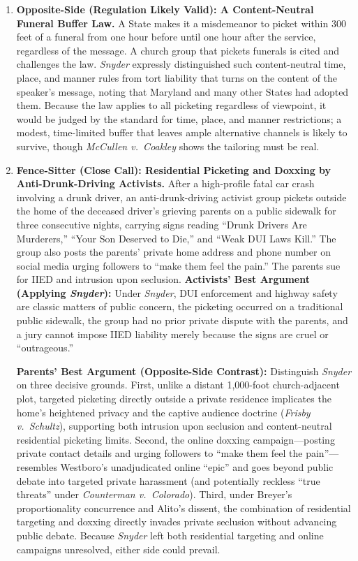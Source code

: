 \documentclass[12pt]{article}
\begin{document}
\begin{enumerate}
\item \textbf{Opposite-Side (Regulation Likely Valid): A Content-Neutral Funeral Buffer Law.} A State makes it a misdemeanor to picket within 300 feet of a funeral from one hour before until one hour after the service, regardless of the message. A church group that pickets funerals is cited and challenges the law. \textit{Snyder} expressly distinguished such content-neutral time, place, and manner rules from tort liability that turns on the content of the speaker's message, noting that Maryland and many other States had adopted them. Because the law applies to all picketing regardless of viewpoint, it would be judged by the standard for time, place, and manner restrictions; a modest, time-limited buffer that leaves ample alternative channels is likely to survive, though \textit{McCullen v.\ Coakley} shows the tailoring must be real.

\item \textbf{Fence-Sitter (Close Call): Residential Picketing and Doxxing by Anti-Drunk-Driving Activists.} After a high-profile fatal car crash involving a drunk driver, an anti-drunk-driving activist group pickets outside the home of the deceased driver's grieving parents on a public sidewalk for three consecutive nights, carrying signs reading ``Drunk Drivers Are Murderers,'' ``Your Son Deserved to Die,'' and ``Weak DUI Laws Kill.'' The group also posts the parents' private home address and phone number on social media urging followers to ``make them feel the pain.'' The parents sue for IIED and intrusion upon seclusion. \textbf{Activists' Best Argument (Applying \textit{Snyder}):} Under \textit{Snyder}, DUI enforcement and highway safety are classic matters of public concern, the picketing occurred on a traditional public sidewalk, the group had no prior private dispute with the parents, and a jury cannot impose IIED liability merely because the signs are cruel or ``outrageous.''

\textbf{Parents' Best Argument (Opposite-Side Contrast):} Distinguish \textit{Snyder} on three decisive grounds. First, unlike a distant 1,000-foot church-adjacent plot, targeted picketing directly outside a private residence implicates the home's heightened privacy and the captive audience doctrine (\textit{Frisby v.\ Schultz}), supporting both intrusion upon seclusion and content-neutral residential picketing limits. Second, the online doxxing campaign---posting private contact details and urging followers to ``make them feel the pain''---resembles Westboro's unadjudicated online ``epic'' and goes beyond public debate into targeted private harassment (and potentially reckless ``true threats'' under \textit{Counterman v.\ Colorado}). Third, under Breyer's proportionality concurrence and Alito's dissent, the combination of residential targeting and doxxing directly invades private seclusion without advancing public debate. Because \textit{Snyder} left both residential targeting and online campaigns unresolved, either side could prevail.

\end{enumerate}
\end{document}
